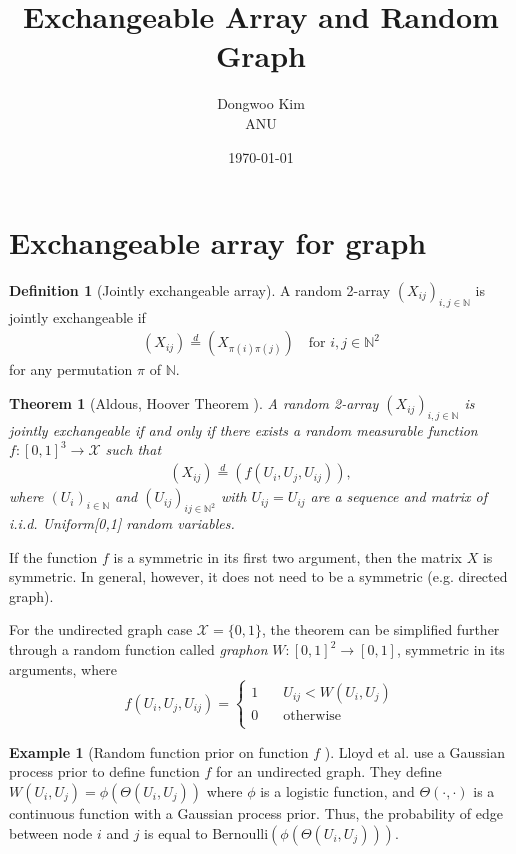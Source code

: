 \documentclass{article}
\title{Exchangeable Array and Random Graph}
\date{\today}
\author{Dongwoo Kim\\ANU}
\newtheorem{theorem}{Theorem} %
\theoremstyle{definition}
\newtheorem{definition}{Definition}
\newtheorem{example}{Example}[definition]
\begin{document}
\maketitle

\section{Exchangeable array for graph}
\begin{definition}[Jointly exchangeable array] A random 2-array $(X_{ij})_{i,j\in \mathbb{N}}$
is jointly exchangeable if
\begin{align}
(X_{ij}) \stackrel{d}{=} (X_{\pi(i)\pi(j)}) \quad \text{for } i,j \in \mathbb{N}^2
\end{align}
for any permutation $\pi$ of $\mathbb{N}$.
\end{definition}

\begin{theorem}[\label{aldous_hoover}Aldous, Hoover Theorem \cite{aldous1981representations,hoover1979relations}] A random 2-array $(X_{ij})_{i,j\in \mathbb{N}}$
is jointly exchangeable if and only if there exists a random measurable function $f:[0,1]^3 \rightarrow \mathcal{X}$ such that
\begin{align}
(X_{ij}) \stackrel{d}{=} (f(U_i, U_j, U_{ij})),
\end{align}
where $(U_{i})_{i \in \mathbb{N}}$ and $(U_{ij})_{ij\in\mathbb{N}^2}$ with $U_{ij} = U_{ij}$ are a sequence and matrix of i.i.d. Uniform[0,1] random variables.
\end{theorem}
If the function $f$ is a symmetric in its first two argument, then the matrix $X$ is symmetric. In general, however, it does not need to be a symmetric (e.g. directed graph).

For the undirected graph case $\mathcal{X} = \{0,1\}$, the theorem can be simplified further through a random function called \textit{graphon} $W:[0,1]^2 \rightarrow [0,1]$, symmetric in its arguments, where
\[ f(U_i, U_j, U_{ij}) = 
  \begin{cases}
    1       & \quad U_{ij} < W(U_i, U_j)\\
    0  & \quad \mathrm{otherwise}\\
  \end{cases}
\]

\begin{example}[Random function prior on function $f$ \cite{Lloyd2013}] Lloyd et al. use a Gaussian process prior to define function $f$ for an undirected graph. They define $W(U_i, U_j) = \phi(\Theta(U_i,U_j))$ where $\phi$ is a logistic function, and $\Theta(\cdot, \cdot)$ is a continuous function with a Gaussian process prior. Thus, the probability of edge between node $i$ and $j$ is equal to Bernoulli$(\phi(\Theta(U_i,U_j)))$.
\end{example}
\end{document}
